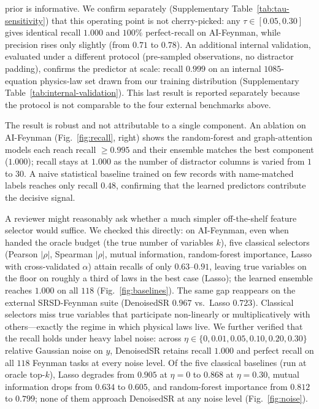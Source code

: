 \documentclass[11pt]{article}
\begin{document}
prior is informative. We confirm separately
(Supplementary Table~\ref{tab:tau-sensitivity}) that this operating point is not
cherry-picked: any $\tau \in [0.05, 0.30]$ gives identical recall $1.000$ and
$100\%$ perfect-recall on AI-Feynman, while precision rises only slightly
(from $0.71$ to $0.78$). An additional internal validation, evaluated under a
different protocol (pre-sampled observations, no distractor padding), confirms
the predictor at scale: recall $0.999$ on an internal $1085$-equation physics-law
set drawn from our training distribution (Supplementary
Table~\ref{tab:internal-validation}). This last result is reported separately
because the protocol is not comparable to the four external benchmarks above.

The result is robust and not attributable to a single component. An ablation on
AI-Feynman (Fig.~\ref{fig:recall}, right) shows the random-forest and graph-attention
models each reach recall $\ge0.995$ and their ensemble matches the best component
($1.000$); recall stays at $1.000$ as the number of distractor columns is varied
from $1$ to $30$. A naive statistical baseline trained on few records with
name-matched labels reaches only recall $0.48$, confirming that the learned
predictors contribute the decisive signal.

A reviewer might reasonably ask whether a much simpler off-the-shelf feature
selector would suffice. We checked this directly: on AI-Feynman, even when handed
the oracle budget (the true number of variables $k$), five classical selectors
(Pearson $|\rho|$, Spearman $|\rho|$, mutual information, random-forest
importance, Lasso with cross-validated $\alpha$) attain recalls of only
$0.63$--$0.91$, leaving true variables on the floor on roughly a third of laws in
the best case (Lasso); the learned ensemble reaches $1.000$ on all $118$
(Fig.~\ref{fig:baselines}). The same gap reappears on the external SRSD-Feynman
suite (DenoisedSR $0.967$ vs.\ Lasso $0.723$). Classical selectors miss true
variables that participate non-linearly or multiplicatively with others---exactly
the regime in which physical laws live. We further verified that the recall holds under heavy label noise: across
$\eta\in\{0,0.01,0.05,0.10,0.20,0.30\}$ relative Gaussian noise on $y$,
DenoisedSR retains recall $1.000$ and perfect recall on all $118$ Feynman tasks
at every noise level. Of the five classical baselines (run at oracle top-$k$),
Lasso degrades from $0.905$ at $\eta{=}0$ to $0.868$ at $\eta{=}0.30$, mutual
information drops from $0.634$ to $0.605$, and random-forest importance from
$0.812$ to $0.799$; none of them approach DenoisedSR at any noise level
(Fig.~\ref{fig:noise}).
\end{document}
